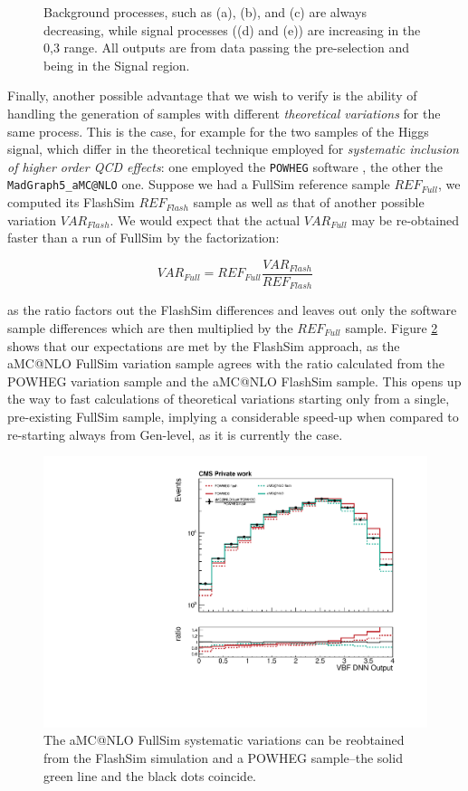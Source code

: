 \begin{figure}
    \caption[Angular distributions]{Background processes, such as (a), (b), and (c) are always decreasing, while signal processes ((d) and (e)) are increasing in the 0,3 range. All outputs are from data passing the pre-selection and being in the Signal region. }\label{fig:DNNout}
\end{figure}

Finally, another possible advantage that we wish to verify is the ability of handling the generation of samples with different \emph{theoretical variations} for the same process. This is the case, for example for the two samples of the Higgs signal, which differ in the theoretical technique employed for \emph{systematic inclusion of higher order QCD effects}: one employed the \texttt{POWHEG} software \cite{Nason_2004}, the other the \texttt{MadGraph5\_aMC@NLO} \cite{powpow} one. Suppose we had a FullSim reference sample $REF_{Full}$, we computed its FlashSim $REF_{Flash}$ sample as well as that of another possible variation $VAR_{Flash}$. We would expect that the actual $VAR_{Full}$ may be re-obtained faster than a run of FullSim by the factorization:

\[VAR_{Full} = REF_{Full} \frac{VAR_{Flash}}{REF_{Flash}}
\]

as the ratio factors out the FlashSim differences and leaves out only the software sample differences which are then multiplied by the $REF_{Full}$ sample. Figure \ref{fig:sysvar} shows that our expectations are met by the FlashSim approach, as the aMC@NLO FullSim variation sample agrees with the ratio calculated from the POWHEG variation sample and the aMC@NLO FlashSim sample. This opens up the way to fast calculations of theoretical variations starting only from a single, pre-existing FullSim sample, implying a considerable speed-up when compared to re-starting always from Gen-level, as it is currently the case.

\begin{figure}
    \centering
    \includegraphics[width=\linewidth]{gfx/ch6/systematic_production.pdf}
    \caption[Systematic production]{The aMC@NLO FullSim systematic variations can be reobtained from the FlashSim simulation and a POWHEG sample--the solid green line and the black dots coincide.}
    \label{fig:sysvar}
\end{figure}

